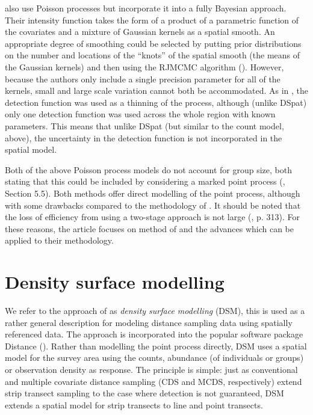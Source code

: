 \documentclass[a4paper,12pt]{article}
\begin{document}
\cite{Niemi:2010kx} also use Poisson processes but incorporate it into a fully Bayesian approach. Their intensity function takes the form of a product of a parametric function of the covariates and a mixture of Gaussian kernels as a spatial smooth. An appropriate degree of smoothing could be selected by putting prior distributions on the number and locations of the ``knots'' of the spatial smooth (the means of the Gaussian kernels) and then using the RJMCMC algorithm (\cite{GREEN:1995dg}). However, because the authors only include a single precision parameter for all of the kernels, small and large scale variation cannot both be accommodated. As in \cite{Johnson:2010gf}, the detection function was used as a thinning of the process, although (unlike DSpat) only one detection function was used across the whole region with known parameters. This means that unlike DSpat (but similar to the count model, above), the uncertainty in the detection function is not incorporated in the spatial model.

Both of the above Poisson process models do not account for group size, both stating that this could be included by considering a marked point process (\cite{cox1980point}, Section 5.5). Both methods offer direct modelling of the point process, although with some drawbacks compared to the methodology of \cite{Hedley:2004et}. It should be noted that the loss of efficiency from using a two-stage approach is not large (\cite{Buckland:2004ts}, p. 313). For these reasons, the article focuses on method of \cite{Hedley:2004et} and the advances which can be applied to their methodology.

\section*{Density surface modelling}
\label{s:dsm}

We refer to the approach of \cite{Hedley:2004et} as \textit{density surface modelling} (DSM), this is used as a rather general description for modeling distance sampling data using spatially referenced data. The approach is incorporated into the popular software package Distance (\cite{Thomas:2010cf}). Rather than modelling the point process directly, DSM  uses a spatial model for the survey area using the counts, abundance (of individuals or groups) or observation density as response. The principle is simple: just as conventional and multiple covariate distance sampling (CDS and MCDS, respectively) extend strip transect sampling to the case where detection is not guaranteed, DSM extends a spatial model for strip transects to line and point transects.
\end{document}
